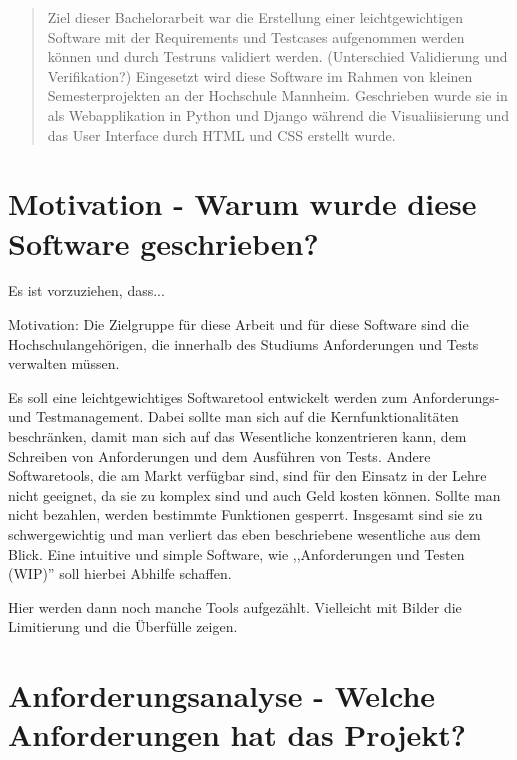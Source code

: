 \documentclass[11pt,a4paper]{report}
\begin{document}

\begin{abstract} 
Ziel dieser Bachelorarbeit war die Erstellung einer leichtgewichtigen Software mit der Requirements und Testcases aufgenommen werden können und durch Testruns validiert werden. (Unterschied Validierung und Verifikation?) Eingesetzt wird diese Software im Rahmen von kleinen Semesterprojekten an der Hochschule Mannheim. Geschrieben wurde sie in als Webapplikation in Python und Django während die Visualiisierung und das User Interface durch HTML und CSS erstellt wurde.
\end{abstract}

\tableofcontents %
\chapter{Motivation - Warum wurde diese Software geschrieben?} \label{chap:motivation}
Es ist vorzuziehen, dass...

Motivation:
Die Zielgruppe für diese Arbeit und für diese Software sind die Hochschulangehörigen, die innerhalb des Studiums Anforderungen und Tests verwalten müssen. 

Es soll eine leichtgewichtiges Softwaretool entwickelt werden zum Anforderungs- und Testmanagement. Dabei sollte man sich auf die Kernfunktionalitäten beschränken, damit man sich auf das Wesentliche konzentrieren kann, dem Schreiben von Anforderungen und dem Ausführen von Tests. Andere Softwaretools, die am Markt verfügbar sind, sind für den Einsatz in der Lehre nicht geeignet, da sie zu komplex sind und auch Geld kosten können. Sollte man nicht bezahlen, werden bestimmte Funktionen gesperrt. Insgesamt sind sie zu schwergewichtig und man verliert das eben beschriebene wesentliche aus dem Blick. Eine intuitive und simple Software, wie ,,Anforderungen und Testen (WIP)'' soll hierbei Abhilfe schaffen.

Hier werden dann noch manche Tools aufgezählt. Vielleicht mit Bilder die Limitierung und die Überfülle zeigen.

\chapter{Anforderungsanalyse - Welche Anforderungen hat das Projekt?} \label{chap:Anforderungen}
\end{document}
